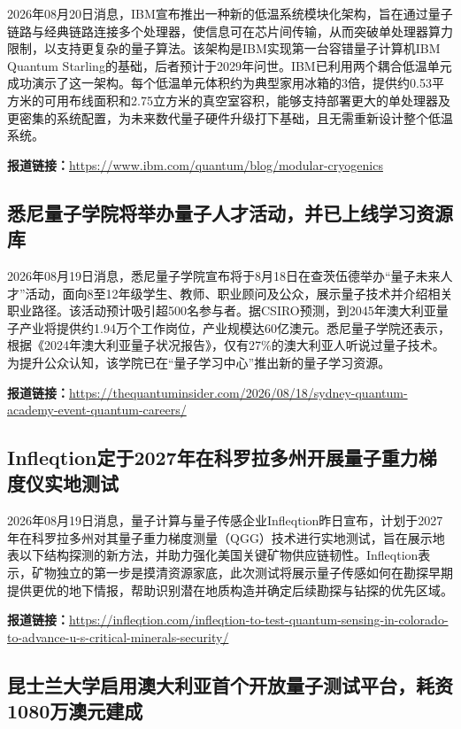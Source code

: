 \documentclass[12pt,a4paper]{ctexart}
\begin{document}
2026年08月20日消息，IBM宣布推出一种新的低温系统模块化架构，旨在通过量子链路与经典链路连接多个处理器，使信息可在芯片间传输，从而突破单处理器算力限制，以支持更复杂的量子算法。该架构是IBM实现第一台容错量子计算机IBM Quantum Starling的基础，后者预计于2029年问世。IBM已利用两个耦合低温单元成功演示了这一架构。每个低温单元体积约为典型家用冰箱的3倍，提供约0.53平方米的可用布线面积和2.75立方米的真空室容积，能够支持部署更大的单处理器及更密集的系统配置，为未来数代量子硬件升级打下基础，且无需重新设计整个低温系统。

\noindent\textbf{报道链接：}\url{https://www.ibm.com/quantum/blog/modular-cryogenics}

\subsection{ 悉尼量子学院将举办量子人才活动，并已上线学习资源库 }

2026年08月19日消息，悉尼量子学院宣布将于8月18日在查茨伍德举办“量子未来人才”活动，面向8至12年级学生、教师、职业顾问及公众，展示量子技术并介绍相关职业路径。该活动预计吸引超500名参与者。据CSIRO预测，到2045年澳大利亚量子产业将提供约1.94万个工作岗位，产业规模达60亿澳元。悉尼量子学院还表示，根据《2024年澳大利亚量子状况报告》，仅有27\%的澳大利亚人听说过量子技术。为提升公众认知，该学院已在“量子学习中心”推出新的量子学习资源。

\noindent\textbf{报道链接：}\url{https://thequantuminsider.com/2026/08/18/sydney-quantum-academy-event-quantum-careers/}

\subsection{ Infleqtion定于2027年在科罗拉多州开展量子重力梯度仪实地测试 }

2026年08月19日消息，量子计算与量子传感企业Infleqtion昨日宣布，计划于2027年在科罗拉多州对其量子重力梯度测量（QGG）技术进行实地测试，旨在展示地表以下结构探测的新方法，并助力强化美国关键矿物供应链韧性。Infleqtion表示，矿物独立的第一步是摸清资源家底，此次测试将展示量子传感如何在勘探早期提供更优的地下情报，帮助识别潜在地质构造并确定后续勘探与钻探的优先区域。

\noindent\textbf{报道链接：}\url{https://infleqtion.com/infleqtion-to-test-quantum-sensing-in-colorado-to-advance-u-s-critical-minerals-security/}

\subsection{ 昆士兰大学启用澳大利亚首个开放量子测试平台，耗资1080万澳元建成 }
\end{document}
